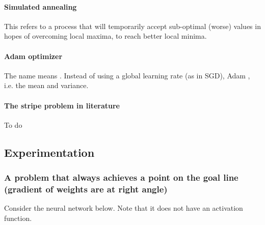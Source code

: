 \documentclass{article}
\begin{document}
\paragraph{Simulated annealing}
This refers to a process that will temporarily accept sub-optimal (worse) values in hopes of overcoming local maxima, to reach better local minima.

\paragraph{Adam optimizer}
The name means .
Instead of using a global learning rate (as in SGD), Adam  \cite{adam}, i.e. the mean and variance.

\paragraph{The stripe problem in literature}
To do

\subsection{Experimentation}

\subsubsection{A problem that always achieves a point on the goal line (gradient of weights are at right angle)}

Consider the neural network below. Note that it does not have an activation function.

\begin{center}
\end{center}
\end{document}
